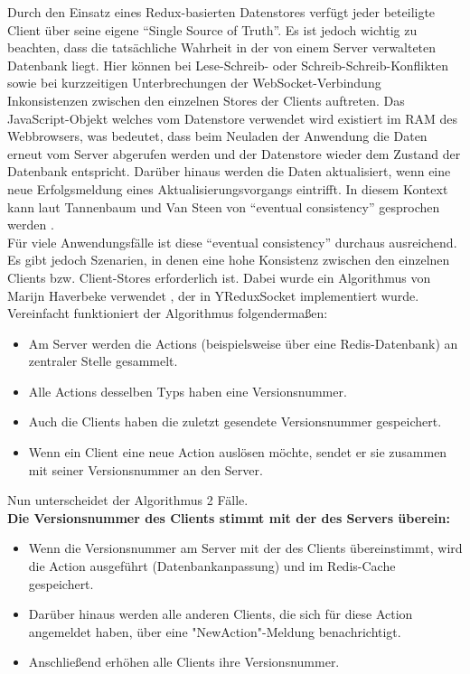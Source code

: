 \documentclass[12pt]{article} %
\begin{document}
Durch den Einsatz eines Redux-basierten Datenstores verfügt jeder beteiligte Client über seine eigene "`Single Source of Truth"'. Es ist jedoch wichtig zu beachten, dass die tatsächliche Wahrheit in der von einem Server verwalteten Datenbank liegt. Hier können bei Lese-Schreib- oder Schreib-Schreib-Konflikten sowie bei kurzzeitigen Unterbrechungen der WebSocket-Verbindung Inkonsistenzen zwischen den einzelnen Stores der Clients auftreten. Das JavaScript-Objekt welches vom Datenstore verwendet wird existiert im RAM des Webbrowsers, was bedeutet, dass beim Neuladen der Anwendung die Daten erneut vom Server abgerufen werden und der Datenstore wieder dem Zustand der Datenbank entspricht. Darüber hinaus werden die Daten aktualisiert, wenn eine neue Erfolgsmeldung eines Aktualisierungsvorgangs eintrifft. In diesem Kontext kann laut Tannenbaum und Van Steen von "`eventual consistency"' gesprochen werden \cite[319, 322]{tanenbaum_verteilte_2008}. \\ 

Für viele Anwendungsfälle ist diese "`eventual consistency"' durchaus ausreichend. Es gibt jedoch Szenarien, in denen eine hohe Konsistenz zwischen den einzelnen Clients bzw. Client-Stores erforderlich ist. Dabei wurde ein Algorithmus von Marijn Haverbeke verwendet \cite{haverbeke_collaborative_2015}, der in YReduxSocket implementiert wurde. Vereinfacht funktioniert der Algorithmus folgendermaßen:

\begin{itemize}
    \item Am Server werden die Actions (beispielsweise über eine Redis-Datenbank) an zentraler Stelle gesammelt.
    \item Alle Actions desselben Typs haben eine Versionsnummer.
    \item Auch die Clients haben die zuletzt gesendete Versionsnummer gespeichert.
    \item Wenn ein Client eine neue Action auslösen möchte, sendet er sie zusammen mit seiner Versionsnummer an den Server.
\end{itemize}

Nun unterscheidet der Algorithmus 2 Fälle. \\

\textbf{Die Versionsnummer des Clients stimmt mit der des Servers überein:}

\begin{itemize}
    \item Wenn die Versionsnummer am Server mit der des Clients übereinstimmt, wird die Action ausgeführt (Datenbankanpassung) und im Redis-Cache gespeichert.
    \item Darüber hinaus werden alle anderen Clients, die sich für diese Action angemeldet haben, über eine "NewAction"-Meldung benachrichtigt.
    \item Anschließend erhöhen alle Clients ihre Versionsnummer.
\end{itemize}
\end{document}
